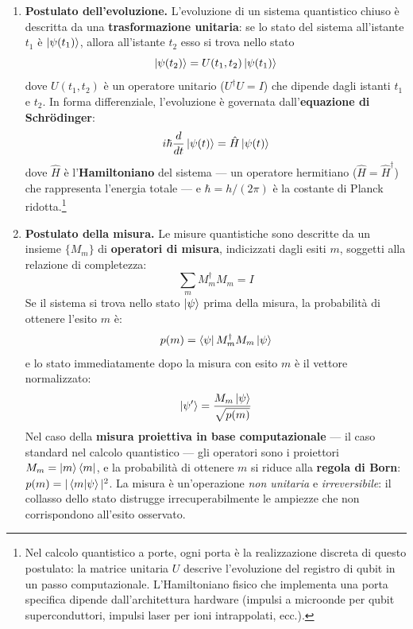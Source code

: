 \begin{onehalfspace}
\begin{enumerate}
    \item \textbf{Postulato dell'evoluzione.} L'evoluzione di un sistema quantistico chiuso è descritta da una \textbf{trasformazione unitaria}: se lo stato del sistema all'istante $t_1$ è $\ket{\psi(t_1)}$, allora all'istante $t_2$ esso si trova nello stato
    \begin{equation}
        \ket{\psi(t_2)} = U(t_1, t_2)\ket{\psi(t_1)}
    \end{equation}
    dove $U(t_1, t_2)$ è un operatore unitario ($U^\dagger U = I$) che dipende dagli istanti $t_1$ e $t_2$. In forma differenziale, l'evoluzione è governata dall'\textbf{equazione di Schrödinger}:
    \begin{equation}
        i\hbar \frac{d}{dt}\ket{\psi(t)} = \hat{H}\ket{\psi(t)}
    \end{equation}
    dove $\hat{H}$ è l'\textbf{Hamiltoniano} del sistema --- un operatore hermitiano ($\hat{H} = \hat{H}^\dagger$) che rappresenta l'energia totale --- e $\hbar = h/(2\pi)$ è la costante di Planck ridotta.\footnote{Nel calcolo quantistico a porte, ogni porta è la realizzazione discreta di questo postulato: la matrice unitaria $U$ descrive l'evoluzione del registro di qubit in un passo computazionale. L'Hamiltoniano fisico che implementa una porta specifica dipende dall'architettura hardware (impulsi a microonde per qubit superconduttori, impulsi laser per ioni intrappolati, ecc.).}

    \item \textbf{Postulato della misura.} Le misure quantistiche sono descritte da un insieme $\{M_m\}$ di \textbf{operatori di misura}, indicizzati dagli esiti $m$, soggetti alla relazione di completezza:
    \begin{equation}
        \sum_m M_m^\dagger M_m = I
    \end{equation}
    Se il sistema si trova nello stato $\ket{\psi}$ prima della misura, la probabilità di ottenere l'esito $m$ è:
    \begin{equation}
        p(m) = \bra{\psi} M_m^\dagger M_m \ket{\psi}
    \end{equation}
    e lo stato immediatamente dopo la misura con esito $m$ è il vettore normalizzato:
    \begin{equation}
        \ket{\psi'} = \frac{M_m\ket{\psi}}{\sqrt{p(m)}}
    \end{equation}
    Nel caso della \textbf{misura proiettiva in base computazionale} --- il caso standard nel calcolo quantistico --- gli operatori sono i proiettori $M_m = \ket{m}\bra{m}$, e la probabilità di ottenere $m$ si riduce alla \textbf{regola di Born}: $p(m) = |\braket{m|\psi}|^2$. La misura è un'operazione \textit{non unitaria} e \textit{irreversibile}: il collasso dello stato distrugge irrecuperabilmente le ampiezze che non corrispondono all'esito osservato.


\end{enumerate}
\end{onehalfspace}
